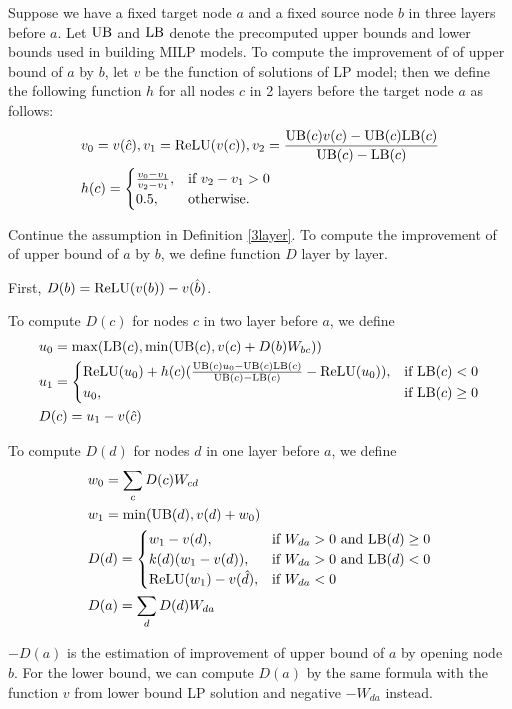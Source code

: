 \begin{definition}\label{3layer}
	Suppose we have a fixed target node $a$ and a fixed source node $b$ in three layers before $a$. Let $\mathrm{UB}$ and $\mathrm{LB}$ denote the precomputed upper bounds and lower bounds used in building MILP models. To compute the improvement of of upper bound of $a$ by $b$, let $v$ be the function of solutions of LP model; then we define the following function $h$ for all nodes $c$ in 2 layers before the target node $a$ as follows:
	\begin{align}
		&v_0 = v(\hat{c}), v_1 = \mathrm{ReLU}(v(c)), v_2 = \frac{\mathrm{UB}(c)v(c)-\mathrm{UB}(c)\mathrm{LB}(c)}{\mathrm{UB}(c)-\mathrm{LB}(c)}\\
		&h(c) =
		\begin{cases}
			\frac{v_0-v_1}{v_2-v_1}, & \text{if } v_2-v_1 > 0\\
			0.5, & \text{otherwise.}
		\end{cases}
	\end{align} 
\end{definition} 

\begin{definition}
	Continue the assumption in Definition \ref{3layer}. To compute the improvement of of upper bound of $a$ by $b$, we define function $D$ layer by layer.
	
	First, $D(b) = \mathrm{ReLU}(v(b))-v(\hat{b})$.
	
To compute $D(c)$ for nodes $c$ in two layer before $a$, we define \begin{align}
	&u_0 = \max(\mathrm{LB}(c),\min(\mathrm{UB}(c),  v(c)+D(b)W_{bc}))\\
	&u_1 = \begin{cases}
		\mathrm{ReLU}(u_0)+h(c)(\frac{\mathrm{UB}(c)u_0-\mathrm{UB}(c)\mathrm{LB}(c)}{\mathrm{UB}(c)-\mathrm{LB}(c)}-\mathrm{ReLU}(u_0)), & \text{if }\mathrm{LB}(c) < 0\\
	u_0, & \text{if }  \mathrm{LB}(c) \geq 0
	\end{cases}\\
	&D(c) = u_1-v(\hat{c})
\end{align}
	
	To compute $D(d)$ for nodes $d$ in one layer before $a$, we define 
	\begin{align}
		&w_0 = \sum_c D(c)W_{cd}\\
		&w_1 = \min(\mathrm{UB}(d),v(d)+w_0)\\		
		&D(d) =
		\begin{cases}
			w_1-v({d}), & \text{if }W_{da} > 0 \text{ and } \mathrm{LB}(d)\geq 0\\
		k(d)(w_1-v({d})), & \text{if }W_{da} > 0 \text{ and } \mathrm{LB}(d)< 0\\
		\mathrm{ReLU}(w_1)-v(\hat{d})	, & \text{if }  W_{da} < 0
		\end{cases}\\
		&D(a) = \sum_d D(d)W_{da}
	\end{align}
\end{definition} $-D(a)$ is the estimation of improvement of upper bound of $a$ by opening node $b$.  For the lower bound, we can compute $D(a)$ by the same formula with the function $v$ from lower bound LP solution and negative $-W_{da}$  instead.
		